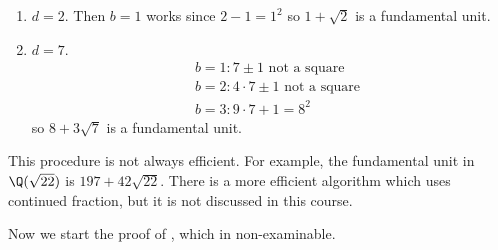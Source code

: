 \documentclass[a4paper]{article}
\begin{document}
\begin{eg}\leavevmode
  \begin{enumerate}
  \item \(d = 2\). Then \(b = 1\) works since \(2 - 1 = 1^2\) so \(1 + \sqrt 2\) is a fundamental unit.
  \item \(d = 7\).
    \begin{align*}
      & b = 1: 7 \pm 1 \text{ not a square} \\
      & b = 2: 4 \cdot 7 \pm 1 \text{ not a square} \\
      & b = 3: 9 \cdot 7 + 1 = 8^2
    \end{align*}
    so \(8 + 3 \sqrt 7\) is a fundamental unit.
  \end{enumerate}
\end{eg}

\begin{note}
  This procedure is not always efficient. For example, the fundamental unit in \(\Q(\sqrt{22})\) is \(197 + 42\sqrt{22}\). There is a more efficient algorithm which uses continued fraction, but it is not discussed in this course.
\end{note}

Now we start the proof of , which in non-examinable.
\end{document}
